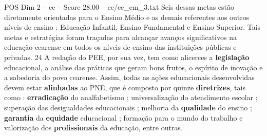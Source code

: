 \begin{textsample}{POS Dim 2 – ce – Score 28.00 – ce/ce\_em\_3.txt}
Seis dessas metas estão diretamente orientadas para o Ensino Médio e as demais referentes aos outros níveis de ensino : Educação Infantil, Ensino Fundamental e Ensino Superior.
Tais metas e estratégias foram traçadas para alcançar avanços significativos na educação cearense em todos os níveis de ensino das instituições públicas e privadas. 24 A redação do PEE, por sua vez, tem como alicerces a \textbf{legislação} educacional, a análise das práticas que geram bons frutos, o espírito de inovação e a sabedoria do povo cearense.
Assim, todas as ações educacionais desenvolvidas devem estar \textbf{alinhadas} ao PNE, que é composto por quinze \textbf{diretrizes}, tais como : \textbf{erradicação} do analfabetismo ; universalização do atendimento escolar ; superação das desigualdades educacionais ; melhoria da \textbf{qualidade} do ensino ; \textbf{garantia} da \textbf{equidade} educacional ; formação para o mundo do trabalho e valorização dos \textbf{profissionais} da educação, entre outras.

\end{textsample}
